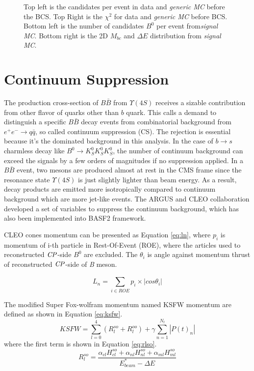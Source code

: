 \begin{figure}[H]
\begin{minipage}[b]{0.5\linewidth}
	\end{minipage}
	
	\caption{Top left is the candidates per event in data and \textit{generic MC} before the BCS. Top Right is the $\chi^2$ for data and \textit{generic MC} before BCS. Bottom left is the number of candidates $B^0$ per event from\textit{signal MC}. Bottom right is the 2D $M_{bc}$ and $\Delta E$ distribution from \textit{signal MC}.}
	\label{fig:b0dist}
\end{figure}
\section{Continuum Suppression}
The production cross-section of $B\bar{B}$ from $\Upsilon{(4S)}$ receives a sizable contribution from other flavor of quarks other than $b$ quark. This calls a demand to distinguish a specific $B\bar{B}$ decay events from combinatorial background from $e^+e^- \to q\bar{q}$, so called continuum suppression (CS). The rejection is essential because it's the dominated background in this analysis.  In the case of $b \to s$ charmless decay like $B^0 \to K_S^0  K_S^0  K_S^0$, the number of continuum background can exceed the signals by a few orders of magnitudes if no suppression applied. In a $B\bar{B}$ event, two mesons are produced almost at rest in the CMS frame since the resonance state $\Upsilon(4S)$ is  just slightly lighter than beam energy. As a result, decay products are emitted more isotropically compared to continuum background which are more jet-like events. The ARGUS and CLEO collaboration\cite{Bevan_2014} developed a set of variables to suppress the continuum background, which has also been implemented into BASF2 framework. 

CLEO cones momentum can be presented as Equation \ref{eq:ln}, where $ p_i $ is momentum of i-th particle in Rest-Of-Event (ROE), where the articles used to reconstructed $\it{CP}$-side $B^0$ are excluded. The $\theta_i$ is angle against momentum thrust of reconstructed $\it{CP}$-side of \textit{B} meson.

\begin{equation}\label{eq:ln}
L_n = \sum_{i\in ROE}^{} p_i \times |cos\theta_i|
\end{equation}

The modified Super Fox-wolfram momentum named KSFW momentum are defined as shown in Equation \ref{eq:ksfw}. 
\begin{equation}\label{eq:ksfw}
KSFW = \sum_{l=0}^{4}( R_l^{so} + R_l^{oo}) + \gamma \sum_{n=1}^{N_t}|P(t)_n|
\end{equation}
where the first term is shown in Equation \ref{eq:rlso}.
\begin{equation}\label{eq:rlso}
R_l^{so} = \frac{\alpha_{cl}H_{cl}^{so} +
				\alpha_{nl}H_{nl}^{so}+
			\alpha_{ml}H_{ml}^{so}}{E^*_{beam}-\Delta E}
\end{equation}


